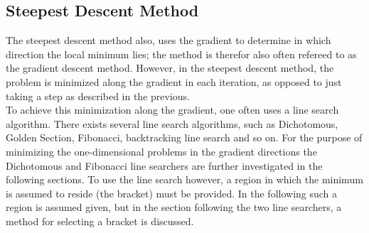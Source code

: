 \subsection{Steepest Descent Method}
The steepest descent method also, uses the gradient to determine in which direction the local minimum lies; the method is therefor also often refereed to as the gradient descent method. However, in the steepest descent method, the problem is minimized along the gradient in each iteration, as opposed to just taking a step as described in the previous.\\
To achieve this minimization along the gradient, one often uses a line search algorithm. There exists several line search algorithms, such as Dichotomous, Golden Section, Fibonacci, backtracking line search and so on. For the purpose of minimizing the one-dimensional problems in the gradient directions the Dichotomous and Fibonacci line searchers are further investigated in the following sections. To use the line search however, a region in which the minimum is assumed to reside (the bracket) must be provided. In the following such a region is assumed given, but in the section following the two line searchers, a method for selecting a bracket is discussed.